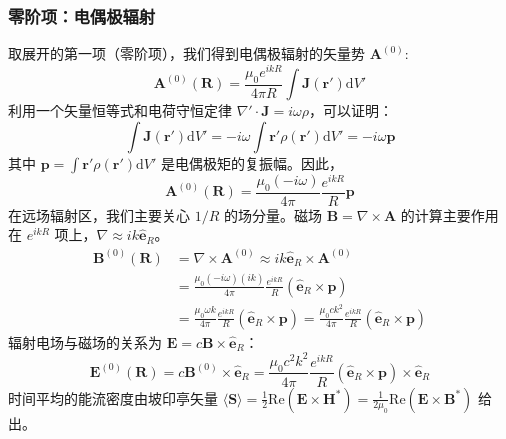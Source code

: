\documentclass[fontset=none]{ctexart}
\begin{document}
\subsubsection{零阶项：电偶极辐射}
取展开的第一项（零阶项），我们得到电偶极辐射的矢量势 $\bm{A}^{(0)}$:
\begin{equation}
    \bm{A}^{(0)}(\bm{R}) = \frac{\mu_0 e^{ikR}}{4\pi R} \int \bm{J}(\bm{r}') \mathrm{d}V'
\end{equation}
利用一个矢量恒等式和电荷守恒定律 $\nabla' \cdot \bm{J} = i\omega\rho$，可以证明：
\begin{equation}
    \int \bm{J}(\bm{r}') \mathrm{d}V' = -i\omega \int \bm{r}' \rho(\bm{r}') \mathrm{d}V' = -i\omega \bm{p}
\end{equation}
其中 $\bm{p} = \int \bm{r}' \rho(\bm{r}') \mathrm{d}V'$ 是电偶极矩的复振幅。因此，
\begin{equation}
    \bm{A}^{(0)}(\bm{R}) = \frac{\mu_0(-i\omega)}{4\pi} \frac{e^{ikR}}{R} \bm{p}
\end{equation}
在远场辐射区，我们主要关心 $1/R$ 的场分量。磁场 $\bm{B} = \nabla \times \bm{A}$ 的计算主要作用在 $e^{ikR}$ 项上，$\nabla \approx ik\bm{\hat{e}}_R$。
\begin{equation}
    \begin{aligned}
        \bm{B}^{(0)}(\bm{R}) &= \nabla \times \bm{A}^{(0)} \approx ik\bm{\hat{e}}_R \times \bm{A}^{(0)} \\
        &= \frac{\mu_0(-i\omega)(ik)}{4\pi} \frac{e^{ikR}}{R} (\bm{\hat{e}}_R \times \bm{p}) \\
        &= \frac{\mu_0 \omega k}{4\pi} \frac{e^{ikR}}{R} (\bm{\hat{e}}_R \times \bm{p}) = \frac{\mu_0 c k^2}{4\pi} \frac{e^{ikR}}{R} (\bm{\hat{e}}_R \times \bm{p})
    \end{aligned}
\end{equation}
辐射电场与磁场的关系为 $\bm{E} = c\bm{B} \times \bm{\hat{e}}_R$：
\begin{equation}
    \bm{E}^{(0)}(\bm{R}) = c \bm{B}^{(0)} \times \bm{\hat{e}}_R = \frac{\mu_0 c^2 k^2}{4\pi} \frac{e^{ikR}}{R} (\bm{\hat{e}}_R \times \bm{p}) \times \bm{\hat{e}}_R
\end{equation}
时间平均的能流密度由坡印亭矢量 $\langle\bm{S}\rangle = \frac{1}{2}\mathrm{Re}(\bm{E} \times \bm{H}^*) = \frac{1}{2\mu_0}\mathrm{Re}(\bm{E} \times \bm{B}^*)$ 给出。
\end{document}
